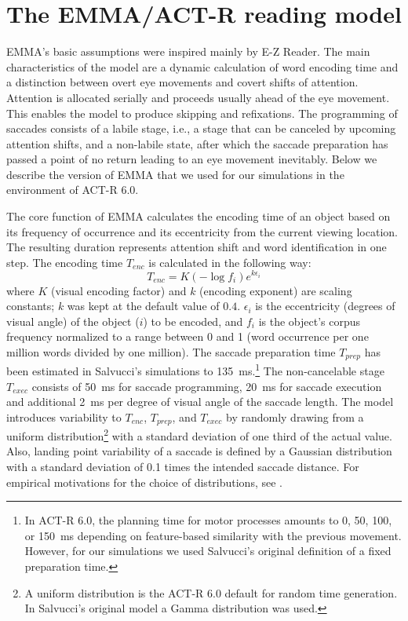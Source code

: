 \section{The EMMA/ACT-R reading model} \label{sec:emma}
EMMA's basic assumptions were inspired mainly by E-Z Reader. The main characteristics of the model are a dynamic calculation of word encoding time and a distinction between overt eye movements and covert shifts of attention. Attention is allocated serially and proceeds usually ahead of the eye movement. This enables the model to produce skipping and refixations. The programming of saccades consists of a labile stage, i.e., a stage that can be canceled by upcoming attention shifts, and a non-labile state, after which the saccade preparation has passed a point of no return leading to an eye movement inevitably. Below we describe the version of EMMA that we used for our simulations in the environment of ACT-R 6.0.

The core function of EMMA calculates the encoding time of an object based on its frequency of occurrence and its eccentricity from the current viewing location. The resulting duration represents attention shift and word identification in one step. The encoding time $T_{enc}$ is calculated in the following way:
\begin{equation}
T_{enc} = K (- \log{f_i}) e^{k\epsilon_i}
\end{equation}
where $K$ (visual encoding factor) and $k$ (encoding exponent) are scaling constants; $k$ was kept at the default value of $0.4$. $\epsilon_i$ is the eccentricity (degrees of visual angle) of the object ($i$) to be encoded, and $f_i$ is the object's corpus frequency normalized to a range between 0 and 1 (word occurrence per one million words divided by one million). The saccade preparation time $T_{prep}$ has been estimated in Salvucci's simulations to 135~ms.\footnote{In ACT-R 6.0, the planning time for motor processes amounts to 0, 50, 100, or 150~ms depending on feature-based similarity with the previous movement. However, for our simulations we used Salvucci's original definition of a fixed preparation time.} The non-cancelable stage $T_{exec}$ consists of 50~ms for saccade programming, 20~ms for saccade execution and additional 2~ms per degree of visual angle of the saccade length. The model introduces variability to $T_{enc}$, $T_{prep}$, and $T_{exec}$ by randomly drawing from a uniform distribution\footnote{A uniform distribution is the ACT-R 6.0 default for random time generation. In Salvucci's original model a Gamma distribution was used.} with a standard deviation of one third of the actual value. Also, landing point variability of a saccade is defined by a Gaussian distribution with a standard deviation of 0.1 times the intended saccade distance. For empirical motivations for the choice of distributions, see \cite{Salvucci2001}.

